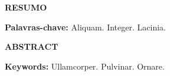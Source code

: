 \begin{center}
  \textbf{RESUMO}
\end{center}

\begin{singlespace}
  \noindent \lipsum[1]
  \bigskip
  \noindent \textbf{Palavras-chave:} Aliquam. Integer. Lacinia.
\end{singlespace}

\begin{center}
  \textbf{ABSTRACT}
\end{center}

\begin{singlespace}
  \noindent \lipsum[2]
  \bigskip
  \noindent \textbf{Keywords:} Ullamcorper. Pulvinar. Ornare.
\end{singlespace}
